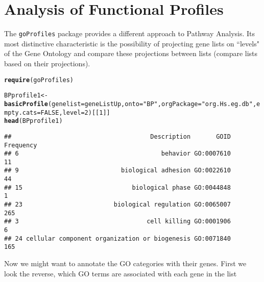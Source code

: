 \documentclass{article}\usepackage[]{graphicx}\usepackage[]{color}
\makeatletter
\newcommand{\hlnum}[1]{\textcolor[rgb]{0.686,0.059,0.569}{#1}}%
\newcommand{\hlstr}[1]{\textcolor[rgb]{0.192,0.494,0.8}{#1}}%
\newcommand{\hlstd}[1]{\textcolor[rgb]{0.345,0.345,0.345}{#1}}%
\newcommand{\hlkwb}[1]{\textcolor[rgb]{0.69,0.353,0.396}{#1}}%
\newcommand{\hlkwc}[1]{\textcolor[rgb]{0.333,0.667,0.333}{#1}}%
\newcommand{\hlkwd}[1]{\textcolor[rgb]{0.737,0.353,0.396}{\textbf{#1}}}%
\newenvironment{kframe}{%
 \def\at@end@of@kframe{}%
 \ifinner\ifhmode%
  \def\at@end@of@kframe{\end{minipage}}%
  \begin{minipage}{\columnwidth}%
 \fi\fi%
 \def\FrameCommand##1{\hskip\@totalleftmargin \hskip-\fboxsep
 \colorbox{shadecolor}{##1}\hskip-\fboxsep
     \hskip-\linewidth \hskip-\@totalleftmargin \hskip\columnwidth}%
 \MakeFramed {\advance\hsize-\width
   \@totalleftmargin\z@ \linewidth\hsize
   \@setminipage}}%
 {\par\unskip\endMakeFramed%
 \at@end@of@kframe}
\newenvironment{knitrout}{}{} %
\makeatother
\begin{document}
\section{Analysis of Functional Profiles}

The \texttt{goProfiles} package provides a different approach to Pathway Analysis. Its most distinctive characteristic is the possibility of projecting gene lists on ``levels" of the Gene Ontology and compare these projections between lists (compare lists based on their projections).

\begin{knitrout}
\color{fgcolor}\begin{kframe}
\begin{alltt}
\hlkwd{require}\hlstd{(goProfiles)}
\end{alltt}


{\ttfamily\noindent\itshape\color{messagecolor}{\#\# Loading required package: goProfiles}}\begin{alltt}
\hlstd{BPprofile1}\hlkwb{<-} \hlkwd{basicProfile}\hlstd{(}\hlkwc{genelist}\hlstd{=geneListUp,} \hlkwc{onto}\hlstd{=}\hlstr{"BP"}\hlstd{,} \hlkwc{orgPackage}\hlstd{=}\hlstr{"org.Hs.eg.db"}\hlstd{,} \hlkwc{empty.cats}\hlstd{=}\hlnum{FALSE}\hlstd{,} \hlkwc{level}\hlstd{=}\hlnum{2}\hlstd{)[[}\hlnum{1}\hlstd{]]}
\hlkwd{head}\hlstd{(BPprofile1)}
\end{alltt}
\begin{verbatim}
##                                      Description       GOID Frequency
## 6                                       behavior GO:0007610        11
## 9                            biological adhesion GO:0022610        44
## 15                              biological phase GO:0044848         1
## 23                         biological regulation GO:0065007       265
## 3                                   cell killing GO:0001906         6
## 24 cellular component organization or biogenesis GO:0071840       165
\end{verbatim}
\end{kframe}
\end{knitrout}

Now we might want to annotate the GO categories with their genes.
First we look the reverse, which GO terms are associated with each gene in the list
\end{document}
